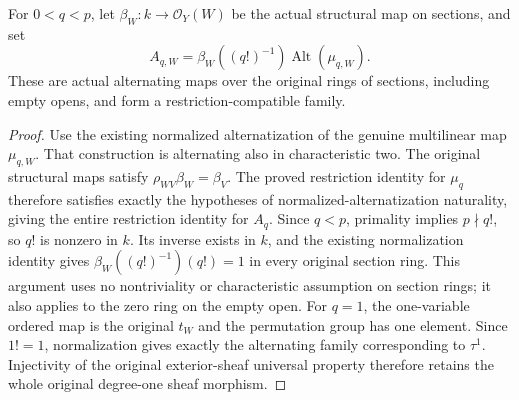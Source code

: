 \begin{definition}
\label{def:di-higher-exterior-normalized-family}
\leanok
{}
For $0<q<p$, let $\beta_W:k\to\mathcal O_Y(W)$ be the actual structural
map on sections, and set
\[
 A_{q,W}=\beta_W((q!)^{-1})\operatorname{Alt}(\mu_{q,W}).
\]
These are actual alternating maps over the original rings of sections,
including empty opens, and form a restriction-compatible family.
\end{definition}
\begin{proof}
\leanok
Use the existing normalized alternatization of the genuine multilinear
map $\mu_{q,W}$. That construction is alternating also in characteristic
two. The original structural maps satisfy
$\rho_{WV}\beta_W=\beta_V$. The proved restriction identity for $\mu_q$
therefore satisfies exactly the hypotheses of normalized-alternatization
naturality, giving the entire restriction identity for $A_q$.
Since $q<p$, primality implies $p\nmid q!$, so $q!$ is nonzero in $k$.
Its inverse exists in $k$, and the existing normalization identity gives
$\beta_W((q!)^{-1})(q!)=1$ in every original section ring. This argument
uses no nontriviality or characteristic assumption on section rings;
it also applies to the zero ring on the empty open.
For $q=1$, the one-variable ordered map is the original $t_W$ and the
permutation group has one element. Since $1!=1$, normalization gives
exactly the alternating family corresponding to $\tau^1$. Injectivity
of the original exterior-sheaf universal property therefore retains
the whole original degree-one sheaf morphism.
\end{proof}

